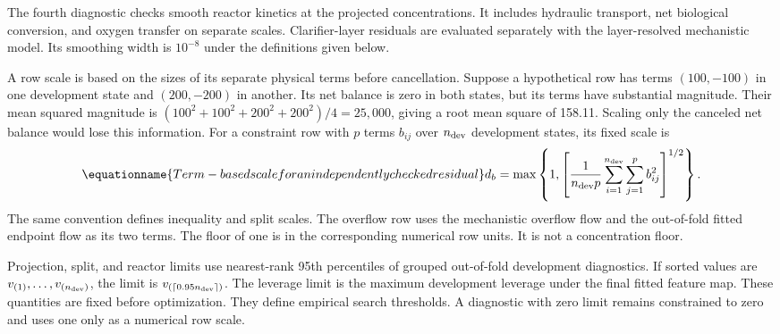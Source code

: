 The fourth diagnostic checks smooth reactor kinetics at the projected concentrations. It includes hydraulic transport, net biological conversion, and oxygen transfer on separate scales. Clarifier-layer residuals are evaluated separately with the layer-resolved mechanistic model. Its smoothing width is $10^{-8}$ under the definitions given below.

A row scale is based on the sizes of its separate physical terms before cancellation. Suppose a hypothetical row has terms $(100,-100)$ in one development state and $(200,-200)$ in another. Its net balance is zero in both states, but its terms have substantial magnitude. Their mean squared magnitude is $(100^2+100^2+200^2+200^2)/4=25{,}000$, giving a root mean square of 158.11. Scaling only the canceled net balance would lose this information. For a constraint row with $p$ terms $b_{ij}$ over $n_{\rm dev}$ development states, its fixed scale is
\begin{equation}
\equationname{Term-based scale for an independently checked residual}
d_b=\max\left\{1,\left[\frac1{n_{\rm dev}p}
\sum_{i=1}^{n_{\rm dev}}\sum_{j=1}^{p}b_{ij}^2\right]^{1/2}\right\}.
\label{eq:plant_term_scales}
\end{equation}
The same convention defines inequality and split scales. The overflow row uses the mechanistic overflow flow and the out-of-fold fitted endpoint flow as its two terms. The floor of one is in the corresponding numerical row units. It is not a concentration floor.

Projection, split, and reactor limits use nearest-rank 95th percentiles of grouped out-of-fold development diagnostics. If sorted values are $v_{(1)},\ldots,v_{(n_{\rm dev})}$, the limit is $v_{(\lceil0.95n_{\rm dev}\rceil)}$. The leverage limit is the maximum development leverage under the final fitted feature map. These quantities are fixed before optimization. They define empirical search thresholds. A diagnostic with zero limit remains constrained to zero and uses one only as a numerical row scale.

